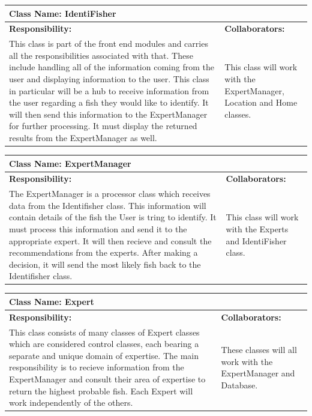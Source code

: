 \documentclass[]{article}
\begin{document}
	\begin{table}[ht]
		\centering
		\begin{tabular}{|p{5cm}|p{5cm}|}
		\hline
		 \multicolumn{2}{|l|}{\textbf{Class Name: IdentiFisher}} \\
		\hline
		\textbf{Responsibility:} & \textbf{Collaborators:} \\ \hline
		This class is part of the front end modules and carries all the responsibilities associated with that. These include handling all of the information coming from the user and displaying information to the user. This class in particular will be a hub to receive information from the user regarding a fish they would like to identify. It will then send this information to the ExpertManager for further processing. It must display the returned results from the ExpertManager as well. & This class will work with the ExpertManager, Location and Home classes. \\
		\hline
		\end{tabular}
	\end{table}

	\begin{table}[ht]
		\centering
		\begin{tabular}{|p{5cm}|p{5cm}|}
		\hline
		 \multicolumn{2}{|l|}{\textbf{Class Name: ExpertManager}} \\
		\hline
		\textbf{Responsibility:} & \textbf{Collaborators:} \\ \hline
		The ExpertManager is a processor class which receives data from the Identifisher class. This information will contain details of the fish the User is tring to identify. It must process this information and send it to the appropriate expert. It will then recieve and consult the recommendations from the experts. After making a decision, it will send the most likely fish back to the Identifisher class. & This class will work with the Experts and IdentiFisher class.\\
		\hline
		\end{tabular}
	\end{table}

	\begin{table}[ht]
		\centering
		\begin{tabular}{|p{5cm}|p{5cm}|}
		\hline
		 \multicolumn{2}{|l|}{\textbf{Class Name: Expert}} \\
		\hline
		\textbf{Responsibility:} & \textbf{Collaborators:} \\ \hline
		This class consists of many classes of Expert classes which are considered control classes, each bearing a separate and unique domain of expertise. The main responsibility is to recieve information from the ExpertManager and consult their area of expertise to return the highest probable fish. Each Expert will work independently of the others. & These classes will all work with the ExpertManager and Database. \\
		\hline
		\end{tabular}
	\end{table}
\end{document}
